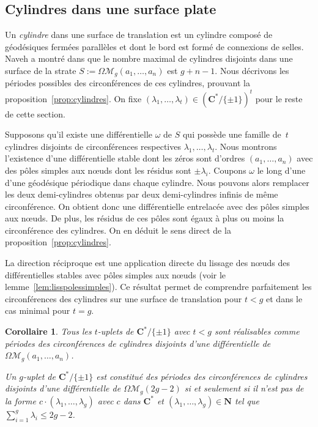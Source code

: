 \documentclass[11pt]{article}
\numberwithin{equation}{section}\renewcommand{\proofname}{Démonstration}
\let\mathcal\mathscr
\newcommand{\CC}{\mathbf{C}}
\newcommand{\NN}{\mathbf{N}}
\newcommand{\omoduli}[1][g]{{\Omega\mathcal M}_{\!#1}}
\newtheorem{cor}[thm]{Corollaire}
\theoremstyle{definition}
\begin{document}
\subsection{Cylindres dans une surface plate}
\label{sec:cylindres}
Un \emph{cylindre} dans une surface de translation est un cylindre composé de géodésiques fermées parallèles et dont le bord est formé de connexions de selles.
Naveh a montré dans \cite{Na} que le nombre maximal de cylindres disjoints dans une surface de la strate $S:=\omoduli(a_{1},\dots,a_{n})$ est $g+n-1$.
Nous décrivons les périodes possibles des circonférences de ces cylindres, prouvant la proposition~\ref{prop:cylindres}. On fixe $(\lambda_{1},\dots,\lambda_{t})\in (\CC^{\ast}/\{\pm1\})^{t}$ pour le reste de cette section.
\par
Supposons qu'il existe une différentielle $\omega$ de $S$ qui possède une famille de~$t$ cylindres disjoints de circonférences respectives $\lambda_{1},\dots,\lambda_{t}$. Nous montrons l'existence d'une différentielle stable dont les zéros sont d'ordres $(a_{1},\dots,a_{n})$ avec des pôles simples aux nœuds dont les résidus sont $\pm \lambda_{i}$. Coupons $\omega$ le long d'une d'une géodésique périodique dans chaque cylindre. Nous pouvons alors remplacer les deux demi-cylindres obtenus par deux demi-cylindres infinis de même circonférence. On obtient donc une différentielle entrelacée avec des pôles simples aux nœuds. De plus, les résidus de ces pôles sont égaux à plus ou moins la circonférence des cylindres. On en déduit le sens direct de la proposition~\ref{prop:cylindres}.
\par
La direction réciproque est une application directe du lissage des nœuds des différentielles stables avec pôles simples aux nœuds (voir le lemme~\ref{lem:lisspolessimples}).
Ce résultat permet de comprendre parfaitement les circonférences des cylindres sur une surface de translation pour $t <g$ et dans le cas minimal pour $t=g$.
\begin{cor}\label{cor:cylindres}
Tous les $t$-uplets de $\CC^{\ast}/\{\pm1\}$ avec $t < g$ sont réalisables comme périodes des circonférences de cylindres disjoints d'une différentielle de $\omoduli(a_{1},\dots,a_{n})$.

Un $g$-uplet de $\CC^{\ast}/\{\pm1\}$ est constitué des périodes des circonférences de cylindres disjoints d'une différentielle de $\omoduli(2g-2)$ si et seulement si il n'est pas de la forme $c \cdot (\lambda_{1},\dots, \lambda_{g})$ avec $c$ dans $\CC^{\ast}$ et $(\lambda_{1},\dots,\lambda_{g})\in \NN$ tel que $\sum_{i=1}^{g} \lambda_{i} \leq 2g-2$.
\end{cor}
\end{document}
